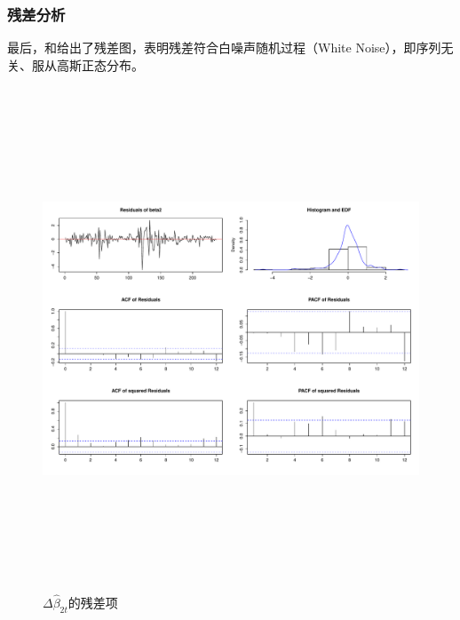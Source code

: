  \subsubsection{残差分析}
 最后，和给出了残差图，表明残差符合白噪声随机过程（White Noise），即序列无关、服从高斯正态分布。
        \begin{figure}%
     \includegraphics[width=15cm,height=15cm]{figures/Rplot15}
    \caption{$\Delta\hat{\beta}_{2t}$的残差项}
    \label{Rplot15}
   \end{figure}
   
